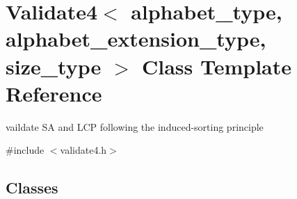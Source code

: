 \hypertarget{class_validate4}{}\section{Validate4$<$ alphabet\+\_\+type, alphabet\+\_\+extension\+\_\+type, size\+\_\+type $>$ Class Template Reference}
\label{class_validate4}


vaildate SA and L\+CP following the induced-\/sorting principle  




{\ttfamily \#include $<$validate4.\+h$>$}

\subsection*{Classes}
